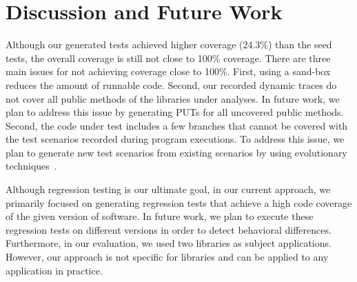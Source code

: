 \section{Discussion and Future Work}
\label{sec:discussion}

Although our generated tests achieved higher coverage (24.3\%) than the seed tests, the overall coverage is still not close to 100\% coverage. There are three main issues for not achieving coverage close to 100\%. First, using a sand-box reduces the amount of runnable code. Second, our recorded dynamic traces do not cover all public methods of the libraries under analyses. In future work, we plan to address this issue by generating PUTs for all uncovered public methods. Second, the code under test includes a few branches that cannot be covered with the test scenarios recorded during program executions. To address this issue, we plan to generate new test scenarios from existing scenarios by using evolutionary techniques~\cite{tonella:etoc}.

Although regression testing is our ultimate goal, in our current approach, we primarily focused on generating regression tests that achieve a high code coverage of the given version of software. In future work, we plan to execute these regression tests on different versions in order to detect behavioral differences. Furthermore, in our evaluation, we used two libraries as subject applications. However, our approach is not specific for libraries and can be applied to any application in practice.